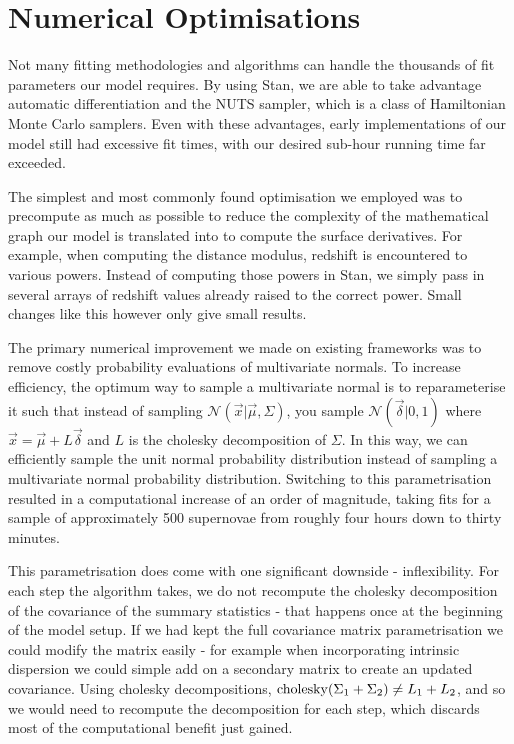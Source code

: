 \documentclass[a4paper,fleqn,usenatbib]{mnras}
\begin{document}
\section{Numerical Optimisations}
\label{app:optimisations}


Not many fitting methodologies and algorithms can handle the thousands of fit parameters our model requires. By using Stan, we are able to take advantage automatic differentiation and the NUTS sampler, which is a class of Hamiltonian Monte Carlo samplers. Even with these advantages, early implementations of our model still had excessive fit times, with our desired sub-hour running time far exceeded. 

The simplest and most commonly found optimisation we employed was to precompute as much as possible to reduce the complexity of the mathematical graph our model is translated into to compute the surface derivatives. For example, when computing the distance modulus, redshift is encountered to various powers. Instead of computing those powers in Stan, we simply pass in several arrays of redshift values already raised to the correct power. Small changes like this however only give small results.

The primary numerical improvement we made on existing frameworks was to remove costly probability evaluations of multivariate normals. To increase efficiency, the optimum way to sample a multivariate normal is to reparameterise it such that instead of sampling $\mathcal{N}(\vec{x}|\vec{\mu}, \Sigma)$, you sample $\mathcal{N}(\vec{\delta}|0,1)$ where $\vec{x} = \vec{\mu} + L \vec{\delta}$ and $L$ is the cholesky decomposition of $\Sigma$. In this way, we can efficiently sample the unit normal probability distribution instead of sampling a multivariate normal probability distribution. Switching to this parametrisation resulted in a computational increase of an order of magnitude, taking fits for a sample of approximately 500 supernovae from roughly four hours down to thirty minutes. 

This parametrisation does come with one significant downside - inflexibility. For each step the algorithm takes, we do not recompute the cholesky decomposition of the covariance of the summary statistics - that happens once at the beginning of the model setup. If we had kept the full covariance matrix parametrisation we could modify the matrix easily - for example when incorporating intrinsic dispersion we could simple add on a secondary matrix to create an updated covariance. Using cholesky decompositions, ${\rm cholesky}(\Sigma_1 + \Sigma_2) \neq L_1 + L_2$, and so we would need to recompute the decomposition for each step, which discards most of the computational benefit just gained.
\end{document}
